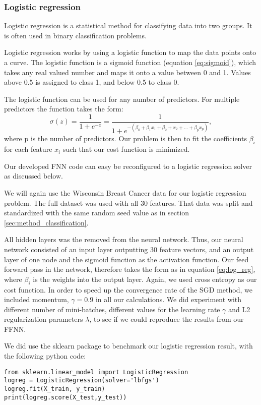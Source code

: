 \subsubsection{Logistic regression}

Logistic regression is a statistical method for classifying data into two
groups. It is often used in binary classification problems.

Logistic regression works by using a logistic function to map the data points
onto a curve. The logistic function is a sigmoid function (equation
\ref{eq:sigmoid}), which takes any real
valued number and maps it onto a value between 0 and 1. 
Values above 0.5 is assigned to class 1, and below 0.5 to class 0. 

The logistic function can be used for any number of predictors. For multiple
predictors the function takes the form: 
\begin{equation*}
    \label{eq:log_reg} 
    \sigma (z) = \frac{1}{1+e^{-z}} =\frac{1}{1+e^{-(\beta_0 + \beta _1 x_1+ \beta_2 +x_2 + \ldots +
    \beta _p x_p)}}, 
\end{equation*}
where p is the number of predictors. Our problem is then to fit the
coefficients $\beta _i$ for each feature $x_i$ such that our cost function is
minimized.  

Our developed FNN code can easy be reconfigured to a logistic regression
solver as discussed below.

We will again use the Wisconsin Breast Cancer data for our logistic regression
problem. The full dataset was used with all 30 features. That data was split
and standardized with the same random seed value as in section
\ref{sec:method_classification}. 

All hidden layers was the removed from the neural network. Thus, our neural
network consisted of an input layer outputting 30 feature vectors, and an
output layer of one node and the sigmoid function as the activation function.
Our feed forward pass in the network, therefore takes the form as in equation
\ref{eq:log_reg}, where $\beta _i$ is the weights into the output layer. 
Again, we used cross entropy as our cost function. In order to speed up the
convergence rate of the SGD method, we included momentum, $\gamma = 0.9$ in all our
calculations. We did experiment with different number of mini-batches,
different values for the learning rate $\gamma$ and L2 regularization parameters
$\lambda $, to see if we could reproduce the results from our FFNN.   

We did use the sklearn package to benchmark our logistic regression result,
with the following python code:
\begin{verbatim}
from sklearn.linear_model import LogisticRegression
logreg = LogisticRegression(solver='lbfgs')
logreg.fit(X_train, y_train)
print(logreg.score(X_test,y_test))
\end{verbatim}








